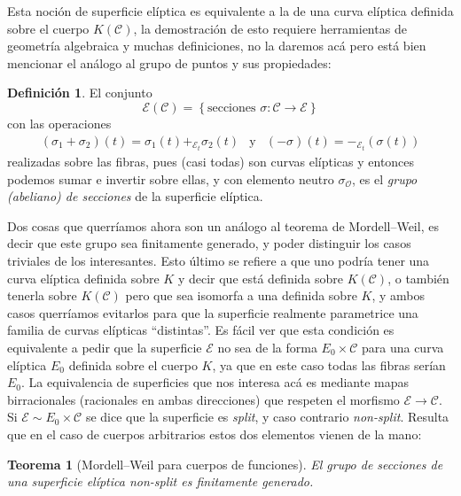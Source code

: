 \documentclass[a4paper]{book}
\theoremstyle{definition}
\newtheorem*{definition*}{Definición}
\theoremstyle{plain}
\newtheorem*{theorem*}{Teorema}
\newcommand{\OO}{\mathcal{O}}
\newcommand{\cc}{\mathcal{C}}
\newcommand{\ee}{\mathcal{E}}
\newcommand{\lla}{\left\lbrace}
\newcommand{\rla}{\right\rbrace}
\begin{document}
Esta noción de superficie elíptica es equivalente a la de una curva elíptica definida sobre el cuerpo $K(\cc)$, la demostración de esto requiere herramientas de geometría algebraica y muchas definiciones, no la daremos acá pero está bien mencionar el análogo al grupo de puntos y sus propiedades:

\begin{definition*}
El conjunto
\[
\ee(\cc) = \lla \text{secciones } \sigma:\cc\to\ee \rla
\]
con las operaciones
\[
\begin{array}{ccc}
(\sigma_1+\sigma_2)(t) = \sigma_1(t) +_{\ee_t} \sigma_2(t) &
\text{y} &
(-\sigma)(t) = -_{\ee_t} (\sigma(t))
\end{array}
\]
realizadas sobre las fibras, pues (casi todas) son curvas elípticas y entonces podemos sumar e invertir sobre ellas, y con elemento neutro $\sigma_\OO$, es el \emph{grupo (abeliano) de secciones} de la superficie elíptica.
\end{definition*}

Dos cosas que querríamos ahora son un análogo al teorema de Mordell--Weil, es decir que este grupo sea finitamente generado, y poder distinguir los casos triviales de los interesantes. Esto último se refiere a que uno podría tener una curva elíptica definida sobre $K$ y decir que está definida sobre $K(\cc)$, o también tenerla sobre $K(\cc)$ pero que sea isomorfa a una definida sobre $K$, y ambos casos querríamos evitarlos para que la superficie realmente parametrice una familia de curvas elípticas ``distintas''. Es fácil ver que esta condición es equivalente a pedir que la superficie $\ee$ no sea de la forma $E_0 \times \cc$ para una curva elíptica $E_0$ definida sobre el cuerpo $K$, ya que en este caso todas las fibras serían $E_0$. La equivalencia de superficies que nos interesa acá es mediante mapas birracionales (racionales en ambas direcciones) que respeten el morfismo $\ee\to\cc$. Si $\ee \sim E_0 \times \cc$ se dice que la superficie es \emph{split}, y caso contrario \emph{non-split}. Resulta que en el caso de cuerpos arbitrarios estos dos elementos vienen de la mano:

\begin{theorem*}[Mordell--Weil para cuerpos de funciones]
El grupo de secciones de una superficie elíptica non-split es finitamente generado.
\end{theorem*}
\end{document}
